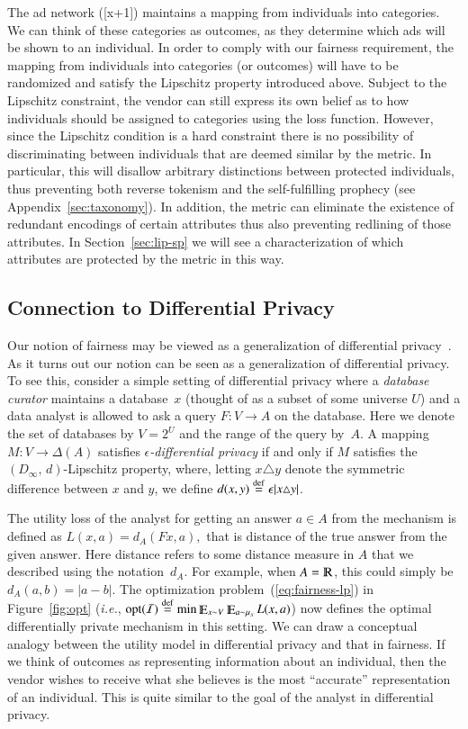 \documentclass[letterpaper,11pt]{article}
\theoremstyle{definition}
\renewcommand{\mathbb}{\varmathbb}
\newcommand{\Esymb}{\mathbb{E}}
\DeclareMathOperator*{\E}{\Esymb}
\newcommand{\cI}{{\cal I}}
\newcommand{\defeq}{\stackrel{\small \mathrm{def}}{=}}
\newcommand{\vendor}{vendor}
\newcommand\dtoDinfty{D_\infty,\, d}
\begin{document}
The ad network ([x+1]) maintains a mapping from
individuals into categories. We can think of these categories as outcomes, as
they determine which ads will be shown to an individual. In order to comply
with our fairness requirement, the mapping from individuals into categories
(or outcomes) will have to be randomized and satisfy the Lipschitz property
introduced above. Subject to the Lipschitz constraint, the \vendor{} can
still express its own belief as to how individuals should be assigned to
categories using the loss function. However, since the Lipschitz condition is
a hard constraint there is no possibility of discriminating between
individuals that are deemed similar by the metric.
In particular, this will disallow arbitrary distinctions between
protected individuals, thus preventing both reverse tokenism
and the self-fulfilling prophecy (see Appendix~\ref{sec:taxonomy}). 
In addition, the metric can eliminate the
existence of redundant encodings of certain attributes thus also preventing
redlining of those attributes. In Section~\ref{sec:lip-sp} we will see a
characterization of which attributes are protected by the metric in this way.



\subsection{Connection to Differential Privacy}
\label{sec:privacy}
Our notion of fairness may be viewed as a generalization of
differential
privacy~\cite{Dwork06,DworkMcNiSm06}.  As it turns
out our notion can be seen as a generalization of differential privacy. To see
this, consider a simple setting of differential privacy  where a
\emph{database curator} maintains a database~$x$  (thought of as a subset of
some universe $U$) and a data analyst is allowed to ask a query $F\colon V\to
A$ on the database.  Here we denote the set of databases by $V=2^U$ and the
range of the query by~$A.$ A mapping $M\colon V\to\Delta(A)$
satisfies \emph{$\epsilon$-differential privacy} if and only if $M$ satisfies
the $(\dtoDinfty)$-Lipschitz property, where,
letting
$x\triangle y$ denote
the symmetric difference between $x$ and $y$,
we define
$d(x,y)\defeq \epsilon |x\triangle y|$.

The utility loss of the analyst for getting an answer $a\in A$ from the
mechanism is defined as $L(x,a)=d_A(Fx,a),$ that is distance of the true
answer from the given answer. Here distance refers to some distance measure in
$A$ that we described using the notation~$d_A.$ For example, when
$A=\mathbb{R}$, this could simply be~$d_A(a,b)=|a-b|.$
%
The optimization problem~(\ref{eq:fairness-lp}) in Figure~\ref{fig:opt}
({\it i.e.},
$\mathrm{opt}(\cI)\defeq \min
\E_{x\sim V}\E_{a\sim\mu_x} L(x,a)$)
now defines the optimal
differentially private mechanism in this setting. We can draw a conceptual
analogy between the utility model in differential privacy and that in
fairness. If we think of outcomes as representing information about an
individual, then the vendor wishes to receive what she believes is the most
``accurate'' representation of an individual. This is quite similar to the
goal of the analyst in differential privacy.
\end{document}
